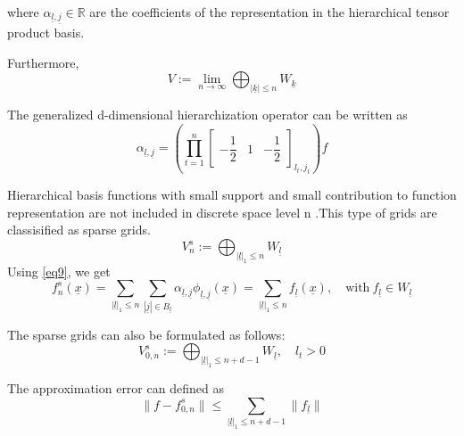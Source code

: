 where $\alpha_{\underline{l},\underline{j}} \in \mathbb{R} $
are the coefficients of the representation in the hierarchical tensor product basis. 

Furthermore,
\begin{equation}
    V := \lim\limits_{n\rightarrow\infty} \bigoplus_{|\underline{k}|\le n} W_{\underline{k}}
\end{equation}

The generalized d-dimensional hierarchization operator can be written as
\begin{equation}
    \alpha_{\underline{l},\underline{j}} = \left( \prod_{t=1}^{n}
    \left[
    \begin{array}{ccc}
	    -\dfrac{1}{2} & 1 & -\dfrac{1}{2}
    \end{array}
    \right]_{l_t,j_t}
     \right) f
\end{equation}

Hierarchical basis functions with small support and small contribution to function representation are not included in discrete space level n .This type of grids are classisified as sparse grids. 
\begin{equation}
    V_{n}^s := \bigoplus_{|\underline{l}|_1\le n} W_{\underline{l}}
\end{equation}
Using \eqref{eq9}, we get 
\begin{equation}
    f_{n}^s \left(\underline{x}\right) 
    = \sum_{|\underline{l}|_1\le n} \sum_{|\underline{j}|\in B_{\underline{l}}} \alpha_{\underline{l},\underline{j}}\phi_{\underline{l},\underline{j}}\left(\underline{x}\right) 
    = \sum_{|\underline{l}|_1\le n} f_{\underline{l}}(\underline{x}), \quad \text{with} \ f_{\underline{l}} \in W_{\underline{l}}
\end{equation}

The sparse grids can also be formulated as follows:
\begin{equation}
    V_{0,n}^s := \bigoplus_{|\underline{l}|_1\le n+d-1} W_{\underline{l}}, \quad l_t > 0
\end{equation}

The approximation error can defined as
\begin{equation}
	\parallel f - f_{0,n}^s \parallel \le \sum_{|\underline{l}|_1\le n+d-1} \parallel f_{\underline{l}}\parallel
\end{equation}

